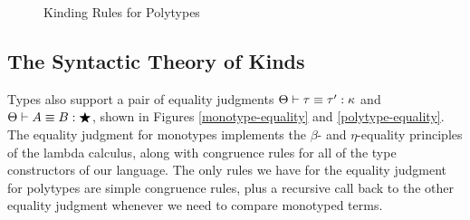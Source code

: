 \begin{figure}[h]
\caption{Kinding Rules for Polytypes}
\label{polytype-kinding}
\end{figure}

\subsection{The Syntactic Theory of Kinds}

Types also support a pair of equality judgments
${\Theta} \vdash {\tau} \equiv {\tau'} : {\kappa}$ and ${\Theta} \vdash {A} \equiv {B} : {\bigstar}$, shown
in Figures \ref{monotype-equality} and \ref{polytype-equality}.  The
equality judgment for monotypes implements the $\beta$- and
$\eta$-equality principles of the lambda calculus, along with
congruence rules for all of the type constructors of our language.
The only rules we have for the equality judgment for polytypes are
simple congruence rules, plus a recursive call back to the other
equality judgment whenever we need to compare monotyped terms.

